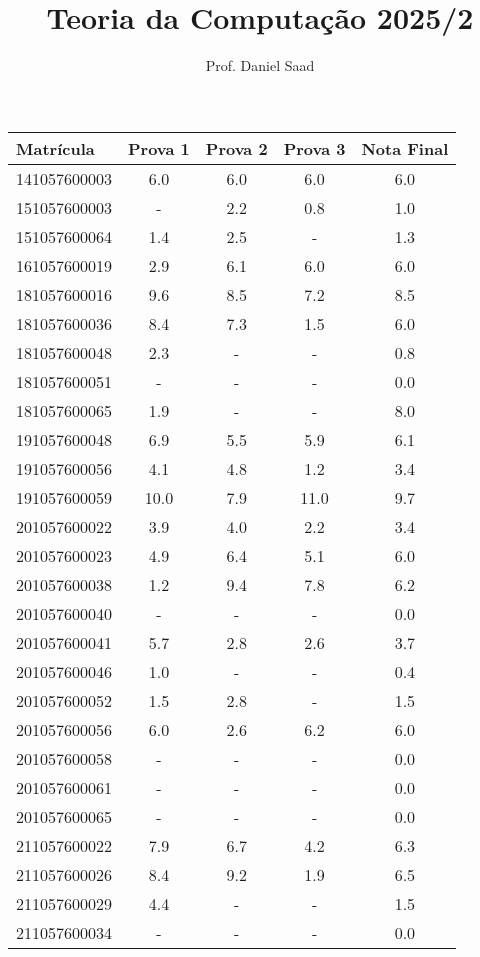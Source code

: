 \documentclass{article}
\title{ Teoria da Computação 2025/2}
\date{}
\author{ Prof. Daniel Saad}
\begin{document}
 \maketitle
    \begin{longtable}{|l|c|c|c|c|}
    \hline
Matrícula & Prova 1 & Prova 2 & Prova 3 & Nota Final\\\hline \endhead   
141057600003 & 6.0 & 6.0 & 6.0 & 6.0\\\hline
151057600003 & - & 2.2 & 0.8 & 1.0\\\hline
151057600064 & 1.4 & 2.5 & - & 1.3\\\hline
161057600019 & 2.9 & 6.1 & 6.0 & 6.0\\\hline
181057600016 & 9.6 & 8.5 & 7.2 & 8.5\\\hline
181057600036 & 8.4 & 7.3 & 1.5 & 6.0\\\hline
181057600048 & 2.3 & - & - & 0.8\\\hline
181057600051 & - & - & - & 0.0\\\hline
181057600065 & 1.9 & - & - & 8.0\\\hline
191057600048 & 6.9 & 5.5 & 5.9 & 6.1\\\hline
191057600056 & 4.1 & 4.8 & 1.2 & 3.4\\\hline
191057600059 & 10.0 & 7.9 & 11.0 & 9.7\\\hline
201057600022 & 3.9 & 4.0 & 2.2 & 3.4\\\hline
201057600023 & 4.9 & 6.4 & 5.1 & 6.0\\\hline
201057600038 & 1.2 & 9.4 & 7.8 & 6.2\\\hline
201057600040 & - & - & - & 0.0\\\hline
201057600041 & 5.7 & 2.8 & 2.6 & 3.7\\\hline
201057600046 & 1.0 & - & - & 0.4\\\hline
201057600052 & 1.5 & 2.8 & - & 1.5\\\hline
201057600056 & 6.0 & 2.6 & 6.2 & 6.0\\\hline
201057600058 & - & - & - & 0.0\\\hline
201057600061 & - & - & - & 0.0\\\hline
201057600065 & - & - & - & 0.0\\\hline
211057600022 & 7.9 & 6.7 & 4.2 & 6.3\\\hline
211057600026 & 8.4 & 9.2 & 1.9 & 6.5\\\hline
211057600029 & 4.4 & - & - & 1.5\\\hline
211057600034 & - & - & - & 0.0\\\hline

\end{longtable}
\end{document}
